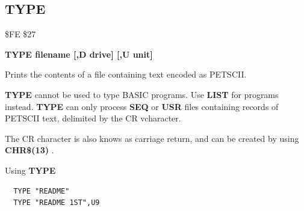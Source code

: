 
\newpage
\subsection{TYPE}
\begin{description}[leftmargin=2cm,style=nextline]
\item [Token:] \$FE \$27
\item [Format:] {\bf TYPE filename [,D drive] [,U unit] }
\item [Usage:] Prints the contents of a file containing
               text encoded as PETSCII.

   \filenamedefinition

   \drivedefinition

   \unitdefinition

\item [Remarks:] {\bf TYPE} cannot be used to type
                 BASIC programs. Use {\bf LIST} for programs instead.
                 {\bf TYPE} can only process {\bf SEQ} or {\bf USR} files
                 containing records of PETSCII text, delimited
                 by the CR vcharacter.

                 The CR character is also knows as carriage return, and can
                 be created by using {\bf CHR\$(13)} .

\item [Example:] Using {\bf TYPE}
\begin{tcolorbox}[colback=black,coltext=white]
\verbatimfont{\codefont}
\begin{verbatim}
  TYPE "README"
  TYPE "README 1ST",U9
\end{verbatim}
\end{tcolorbox}
\end{description}


\newpage
